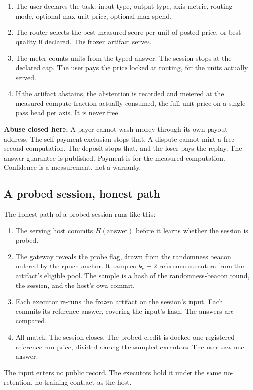 \documentclass[11pt]{article}
\begin{document}
\begin{enumerate}
    \item The user declares the task: input type, output type, axis
          metric, routing mode, optional max unit price, optional max
          spend.
    \item The router selects the best measured score per unit of
          posted price, or best quality if declared. The frozen artifact
          serves.
    \item The meter counts units from the typed answer. The session
          stops at the declared cap. The user pays the price locked at
          routing, for the units actually served.
    \item If the artifact abstains, the abstention is recorded and
          metered at the measured compute fraction actually consumed, the
          full unit price on a single-pass head per axis. It is never free.
\end{enumerate}
\textbf{Abuse closed here.} A payer cannot wash money through its
own payout address. The self-payment exclusion stops that. A
dispute cannot mint a free second computation. The deposit stops
that, and the loser pays the replay. The answer guarantee is
published. Payment is for the measured computation. Confidence is
a measurement, not a warranty.

\subsection{A probed session, honest path}

The honest path of a probed session runs like this:

\begin{enumerate}
    \item The serving host commits $H(\text{answer})$ before it
          learns whether the session is probed.
    \item The gateway reveals the probe flag, drawn from the
          randomness beacon, ordered by the epoch anchor. It samples
          $k_e=2$ reference executors from the
          artifact's eligible pool. The sample is a hash of the
          randomness-beacon round, the session, and the host's own commit.
    \item Each executor re-runs the frozen artifact on the session's
          input. Each commits its reference answer, covering the input's
          hash. The answers are compared.
    \item All match. The session closes. The probed credit is docked
          one registered reference-run price, divided among the sampled
          executors. The user saw one answer.
\end{enumerate}
The input enters no public record. The executors hold it under
the same no-retention, no-training contract as the host.
\end{document}
